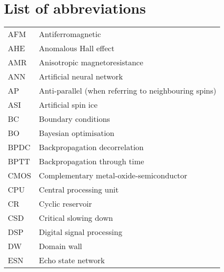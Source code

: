 \chapter{List of abbreviations}
{ %
    \addtolength{\skip\footins}{1pc}
    \begin{longtable}[l]{ll}
        AFM   & Antiferromagnetic                          \\
        AHE   & Anomalous Hall effect                       \\
        AMR   & Anisotropic magnetoresistance               \\
        ANN   & Artificial neural network                   \\
        AP    & Anti-parallel (when referring to neighbouring spins) \\
        ASI   & Artificial spin ice                         \\
        BC    & Boundary conditions                         \\
        BO    & Bayesian optimisation                       \\
        BPDC  & Backpropagation decorrelation               \\
        BPTT  & Backpropagation through time                \\
        CMOS  & Complementary metal-oxide-semiconductor     \\
        CPU   & Central processing unit                     \\
        CR    & Cyclic reservoir                            \\
        CSD   & Critical slowing down                       \\
        DSP   & Digital signal processing                   \\
        DW    & Domain wall                                 \\
        ESN   & Echo state network                          \\

\end{longtable}}
